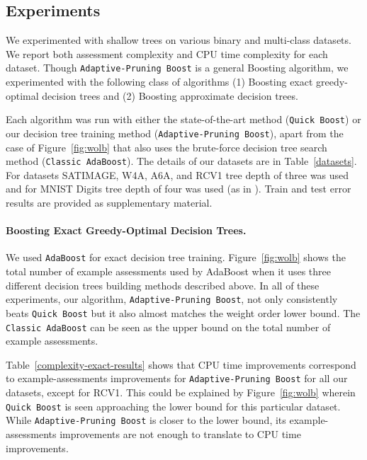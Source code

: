 \subsection{Experiments}
We experimented with shallow trees on various binary and multi-class datasets.
We report both assessment complexity and CPU time complexity for each dataset. Though \texttt{Adaptive-Pruning Boost} is a general Boosting algorithm, we experimented with the following class of algorithms (1) Boosting exact greedy-optimal decision trees and (2) Boosting approximate decision trees.

Each algorithm was run with either the state-of-the-art method (\texttt{Quick Boost}) or our decision tree training method (\texttt{Adaptive-Pruning Boost}), apart from the case of Figure~\ref{fig:wolb} that also uses the brute-force decision tree search method (\texttt{Classic AdaBoost}). The details of our datasets are in Table~\ref{datasets}. For datasets SATIMAGE, W4A, A6A, and RCV1 tree depth of three was used and for MNIST Digits tree depth of four was used (as in \citet{icml2013_appel13}). Train and test error results are provided as supplementary material.



\paragraph{Boosting Exact Greedy-Optimal Decision Trees.}
We used \texttt{AdaBoost} for exact decision tree training.
Figure~\ref{fig:wolb} shows the total number of example assessments used by AdaBoost when it uses three different decision trees building methods described above. In all of these experiments, our algorithm, \texttt{Adaptive-Pruning Boost}, not only consistently beats \texttt{Quick Boost} but it also almost matches the weight order lower bound. The \texttt{Classic AdaBoost} can be seen as the upper bound on the total number of example assessments.

Table~\ref{complexity-exact-results} shows that CPU time improvements correspond to example-assessments improvements for \texttt{Adaptive-Pruning Boost} for all our datasets, except for RCV1. This could be explained by Figure~\ref{fig:wolb} wherein \texttt{Quick Boost} is seen approaching the lower bound for this particular dataset. While \texttt{Adaptive-Pruning Boost} is closer to the lower bound, its example-assessments improvements are not enough to translate to CPU time improvements.



